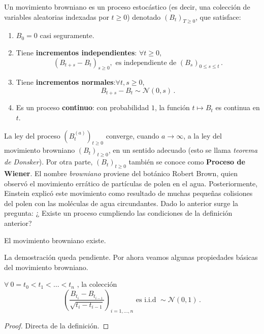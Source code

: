 \begin{definition}
        \label{def:mb}
        Un movimiento browniano es un proceso estocástico (es decir, una colección de variables aleatorias indexadas por $t \geq 0$) denotado $(B_t)_{T \geq 0}$, que satisface:     
\renewcommand{\labelenumi}{\roman{enumi})}
\begin{enumerate}
    \item $B_0 = 0$ casi seguramente.
    \item Tiene \textbf{incrementos independientes}: $\forall  t\geq 0$,
        \begin{equation*}
                (B_{t+s} - B_t)_{s \geq 0}, \text{ es independiente de } (B_{s})_{0 \leq s \leq t}\,.
        \end{equation*}
    \item Tiene \textbf{incrementos normales}:\espacio $\forall  t,s \geq 0$,
        \begin{equation*}
                B_{t+s} - B_t \sim \mathcal{N}(0,s)\,.
        \end{equation*}
    \item Es un proceso \textbf{continuo}: con probabilidad $1$, la función $t \mapsto B_t$ es continua en $t$.
\end{enumerate}
\end{definition}

La ley del proceso $(B_{t}^{(a)})_{t \geq 0}$ converge, cuando $a \rightarrow \infty$, a la ley del movimiento browniano $(B_t)_{t \geq 0}$, en un sentido adecuado (esto se llama \textit{teorema de Donsker}). Por otra parte, $(B_t)_{t \geq 0}$ también se conoce como \textbf{Proceso de Wiener}. El nombre \textit{browniano} proviene del botánico Robert Brown, quien observó el movimiento errático de partículas de polen en el agua. Posteriormente, Einstein explicó este movimiento como resultado de muchas pequeñas colisiones del polen con las moléculas de agua circundantes.
\newp Dado lo anterior surge la pregunta: ¿ Existe un proceso cumpliendo las condiciones de la definición anterior?

\begin{theorem}
    \label{teo:mb}
    El movimiento browniano existe.
\end{theorem}
La demostración queda pendiente. Por ahora veamos algunas propiedades básicas del movimiento browniano.

\begin{proposition}
$\forall ~ 0 = t_0 < t_1 < \ldots < t_n$ , la colección 
\begin{equation*}
    \left( \frac{B_{t_i} - B_{t_{i-1}}}{\sqrt{t_i - t_{i-1}} }
    \right)_{i = 1, \ldots,n} \text{ es i.i.d } \sim \mathcal{N}(0,1)\,.
\end{equation*}
\end{proposition}
\begin{proof}
\gris
Directa de la definición.
\negro
\end{proof}


